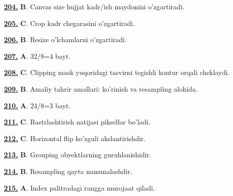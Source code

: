 \documentclass[10pt,a4paper,oneside]{article}
\begin{document}
\noindent\hyperlink{q204}{\textbf{204.}} \textbf{B}.  Canvas size hujjat kadr/ish maydonini o'zgartiradi.
\par\vspace{3mm}
\noindent\hyperlink{q205}{\textbf{205.}} \textbf{C}.  Crop kadr chegarasini o'zgartiradi.
\par\vspace{3mm}
\noindent\hyperlink{q206}{\textbf{206.}} \textbf{B}.  Resize o'lchamlarni o'zgartiradi.
\par\vspace{3mm}
\noindent\hyperlink{q207}{\textbf{207.}} \textbf{A}.  32/8=4 bayt.
\par\vspace{3mm}
\noindent\hyperlink{q208}{\textbf{208.}} \textbf{C}.  Clipping mask yuqoridagi tasvirni tegishli kontur orqali cheklaydi.
\par\vspace{3mm}
\noindent\hyperlink{q209}{\textbf{209.}} \textbf{B}.  Amaliy tahrir amallari: ko'rinish va resampling alohida.
\par\vspace{3mm}
\noindent\hyperlink{q210}{\textbf{210.}} \textbf{A}.  24/8=3 bayt.
\par\vspace{3mm}
\noindent\hyperlink{q211}{\textbf{211.}} \textbf{C}.  Rastrlashtirish natijasi piksellar bo'ladi.
\par\vspace{3mm}
\noindent\hyperlink{q212}{\textbf{212.}} \textbf{C}.  Horizontal flip ko'zguli akslantirishdir.
\par\vspace{3mm}
\noindent\hyperlink{q213}{\textbf{213.}} \textbf{B}.  Grouping obyektlarning guruhlanishidir.
\par\vspace{3mm}
\noindent\hyperlink{q214}{\textbf{214.}} \textbf{B}.  Resampling qayta namunalashdir.
\par\vspace{3mm}
\noindent\hyperlink{q215}{\textbf{215.}} \textbf{A}.  Index palitradagi rangga murojaat qiladi.
\par\vspace{3mm}
\end{document}
